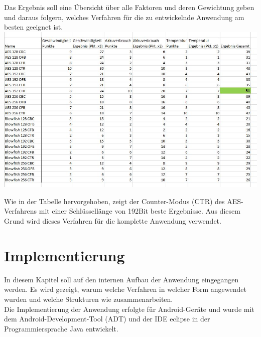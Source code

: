 \documentclass[10pt, a4paper,headsepline,pointednumbers]{scrreprt}
\begin{document}
Das Ergebnis soll eine Übersicht über alle Faktoren und deren Gewichtung geben und daraus folgern, welches Verfahren für die zu entwickelnde Anwendung am besten geeignet ist.  \\

\includegraphics[scale=0.65]{tabelle_Cryptovergleich_einzeln.JPG}
\hfill

Wie in der Tabelle hervorgehoben, zeigt der Counter-Modus (CTR) des AES-Verfahrens mit einer Schlüssellänge von 192Bit beste Ergebnisse. Aus diesem Grund wird dieses Verfahren für die komplette Anwendung verwendet.


\chapter{Implementierung}
In diesem Kapitel soll auf den internen Aufbau der Anwendung eingegangen werden. Es wird gezeigt, warum welche Verfahren in welcher Form angewendet wurden und welche Strukturen wie zusammenarbeiten. \\
Die Implementierung der Anwendung erfolgte für Android-Geräte und wurde mit dem Android-Development-Tool (ADT) und der IDE eclipse in der Programmiersprache Java entwickelt.  
\end{document}
